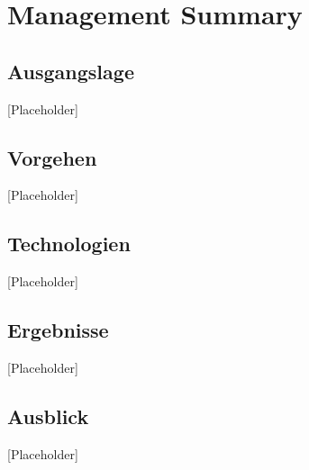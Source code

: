 {}
\section*{Management Summary}
\subsection*{Ausgangslage}
[Placeholder]

\subsection*{Vorgehen}
[Placeholder]

\subsection*{Technologien}
[Placeholder]

\subsection*{Ergebnisse}
[Placeholder]

\subsection*{Ausblick}
[Placeholder]
